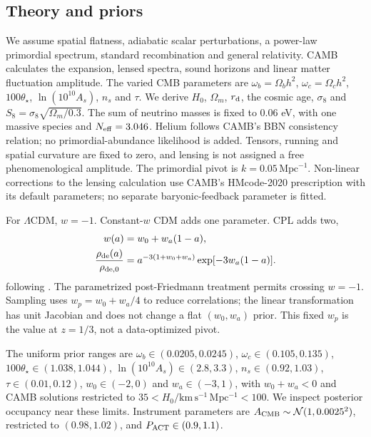 \documentclass[fleqn,usenatbib]{mnras}
\newcommand{\lcdm}{$\Lambda$CDM}
\newcommand{\hunit}{\mathrm{km\,s^{-1}\,Mpc^{-1}}}
\newcommand{\rd}{r_{\rm d}}
\begin{document}
\subsection{Theory and priors}
We assume spatial flatness, adiabatic scalar perturbations, a power-law
primordial spectrum, standard recombination and general relativity. CAMB
\citep{CAMB} calculates the expansion, lensed spectra, sound horizons and linear
matter fluctuation amplitude. The varied CMB parameters are
$\omega_b=\Omega_bh^2$, $\omega_c=\Omega_ch^2$, $100\theta_\star$,
$\ln(10^{10}A_s)$, $n_s$ and $\tau$. We derive $H_0$, $\Omega_m$, $\rd$,
the cosmic age, $\sigma_8$ and $S_8=\sigma_8\sqrt{\Omega_m/0.3}$.
The sum of neutrino masses is fixed to $0.06$ eV, with one massive species and
$N_{\rm eff}=3.046$. Helium follows CAMB's BBN consistency relation; no
primordial-abundance likelihood is added. Tensors, running and spatial curvature
are fixed to zero, and lensing is not assigned a free phenomenological amplitude.
The primordial pivot is $k=0.05\,\mathrm{Mpc}^{-1}$. Non-linear corrections to
the lensing calculation use CAMB's HMcode-2020 prescription with its default
parameters; no separate baryonic-feedback parameter is fitted.

For \lcdm, $w=-1$. Constant-$w$ CDM adds one parameter. CPL adds two,
\begin{equation}
 \begin{aligned}
 w(a)&=w_0+w_a(1-a),\\
 \frac{\rho_{\rm de}(a)}{\rho_{{\rm de},0}}
 &=a^{-3(1+w_0+w_a)}\exp[-3w_a(1-a)].
 \end{aligned}
\end{equation}
following \citet{CPL,Linder}. The parametrized post-Friedmann treatment permits
crossing $w=-1$. Sampling uses $w_p=w_0+w_a/4$ to reduce correlations; the linear
transformation has unit Jacobian and does not change a flat $(w_0,w_a)$ prior.
This fixed $w_p$ is the value at $z=1/3$, not a data-optimized pivot.

The uniform prior ranges are $\omega_b\in(0.0205,0.0245)$,
$\omega_c\in(0.105,0.135)$, $100\theta_\star\in(1.038,1.044)$,
$\ln(10^{10}A_s)\in(2.8,3.3)$, $n_s\in(0.92,1.03)$,
$\tau\in(0.01,0.12)$, $w_0\in(-2,0)$ and $w_a\in(-3,1)$,
with $w_0+w_a<0$ and CAMB solutions restricted to
$35<H_0/\hunit<100$. We inspect posterior occupancy near these limits.
Instrument parameters are $A_{\rm CMB}\sim\mathcal{N}(1,0.0025^2)$, restricted
to $(0.98,1.02)$, and $P_{\rm ACT}\in(0.9,1.1)$.
\end{document}
